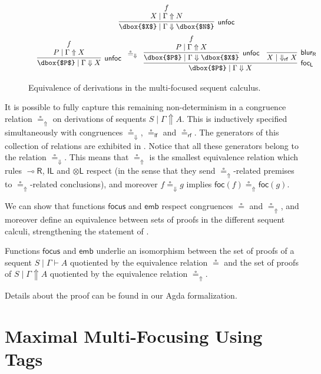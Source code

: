 \documentclass[runningheads]{llncs}
\newcommand{\tl}{\otimes \mathsf{L}}
\newcommand{\lright}{{\multimap}\mathsf{R}}
\newcommand{\unitl}{\mathsf{IL}}
\newcommand{\otL}{\tl}
\newcommand{\lolliR}{\lright}
\newcommand{\IL}{\unitl}
\newcommand{\rf}{\dn_\mathsf{rf}}%
\newcommand{\proofbox}[1]{\begin{tabular}{l} #1 \end{tabular}}
\newcommand{\up}{\Uparrow}
\newcommand{\dn}{\Downarrow}
\newcommand{\focL}{\mathsf{foc_L}}
\newcommand{\foc}{\mathsf{foc}}
\newcommand{\blurR}{\mathsf{blur_R}}
\newcommand{\unfoc}{\mathsf{unfoc}}
\newcommand{\focus}{\mathsf{focus}}
\newcommand{\emb}{\mathsf{emb}}
\begin{document}
\begin{figure}[hbpt]
\[\begin{array}{c}
{{    \infer[\unfoc]{\dbox{$X$} \mid \Gamma \dn \dbox{$N$}}{
      \deduce{X \mid \Gamma \up N}{f}
    }
  }
}
\\[6pt]
\proofbox{
  \infer[\unfoc]{\dbox{$P$} \mid \Gamma \dn X}{
    \deduce{P \mid \Gamma \up X}{f}
  }
}
\circeq_\dn
\proofbox{
  \infer[\focL]{\dbox{$P$} \mid \Gamma \dn X}{
    \infer[\unfoc]{\dbox{$P$} \mid \Gamma \dn \dbox{$X$}}{
      \deduce{P \mid \Gamma \up X}{f}
    }
    &
    \infer[\blurR]{X \mid ~ \rf X}{}
  }
}
\end{array}
\]
\caption{Equivalence of derivations in the multi-focused sequent calculus.}
\label{sec:app}
\end{figure}

It is possible to fully capture this remaining non-determinism in a congruence relation $\circeq_\up$ on derivations of sequents $S \mid \Gamma \up A$. This is inductively specified simultaneously with congruences $\circeq_\dn$, $\circeq_\mathsf{lf}$ and $\circeq_\mathsf{rf}$. The generators of this collection of relations are exhibited in . Notice that all these generators belong to the relation $\circeq_\dn$. This means that $\circeq_\up$ is the smallest equivalence relation which rules $\lolliR$, $\IL$ and $\otL$ respect (in the sense that they send $\circeq_\up$-related premises to $\circeq_\up$-related conclusions), and moreover $f \circeq_\dn g$ implies $\foc(f) \circeq_\up \foc(g)$.

We can show that functions $\focus$ and $\emb$ respect congruences $\circeq$ and $\circeq_\up$, and moreover define an equivalence between sets of proofs in the different sequent calculi, strengthening the statement of .
\begin{theorem}\label{thmeq}
  Functions $\focus$ and $\emb$ underlie an isomorphism between the set of proofs of a sequent $S \mid \Gamma \vdash A$ quotiented by the equivalence relation $\circeq$ and the set of proofs of $S \mid \Gamma \up A$ quotiented by the equivalence relation $\circeq_\up$.
\end{theorem}
Details about the proof can be found in our Agda formalization.

\section{Maximal Multi-Focusing Using Tags}\label{sec:maxfocus}
\end{document}
